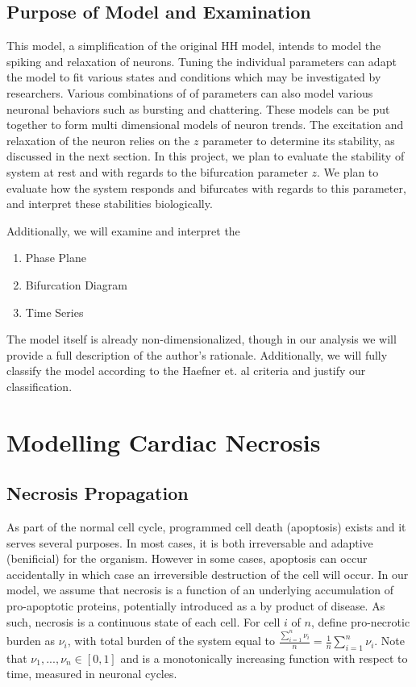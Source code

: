 \documentclass[11pt]{article}
\begin{document}
\subsection{Purpose of Model and Examination}

This model, a simplification of the original HH model, intends to model the spiking and relaxation of neurons. Tuning the individual parameters can adapt the model to fit various states and conditions which may be investigated by researchers. Various combinations of of parameters can also model various neuronal behaviors such as bursting and chattering. These models can be put together to form multi dimensional models of neuron trends. The excitation and relaxation of the neuron relies on the $z$ parameter to determine its stability, as discussed in the next section. 
In this project, we plan to evaluate the stability of system at rest and with regards to the bifurcation parameter $z$. We plan to evaluate how the system responds and bifurcates with regards to this parameter, and interpret these stabilities biologically. %

Additionally, we will examine and interpret the 

\begin{enumerate}
	\item Phase Plane
	\item Bifurcation Diagram
	\item Time Series
\end{enumerate}

The model itself is already non-dimensionalized, though in our analysis we will provide a full description of the author's rationale. Additionally, we will fully classify the model according to the Haefner et. al criteria and justify our classification.


\section{Modelling Cardiac Necrosis} 
\subsection{Necrosis Propagation}

As part of the normal cell cycle, programmed cell death (apoptosis) exists and it serves several purposes. In most cases, it is both irreversable and adaptive (benificial) for the organism. However in some cases, apoptosis can occur accidentally in which case an irreversible destruction of the cell will occur. In our model, we assume that necrosis is a function of an underlying accumulation of pro-apoptotic proteins, potentially introduced as a by product of disease. As such, necrosis is a continuous state of each cell. For cell $i$ of $n$, define pro-necrotic burden as $\nu_i$, with total burden of the system equal to $\frac{\sum^n_{i=1} \nu_i}{n}=\frac{1}{n} \sum^n_{i=1} \nu_i$. Note that $\nu_{1}, ..., \nu_{n} \in [0,1]$ and is a monotonically increasing function with respect to time, measured in neuronal cycles. 
\end{document}
